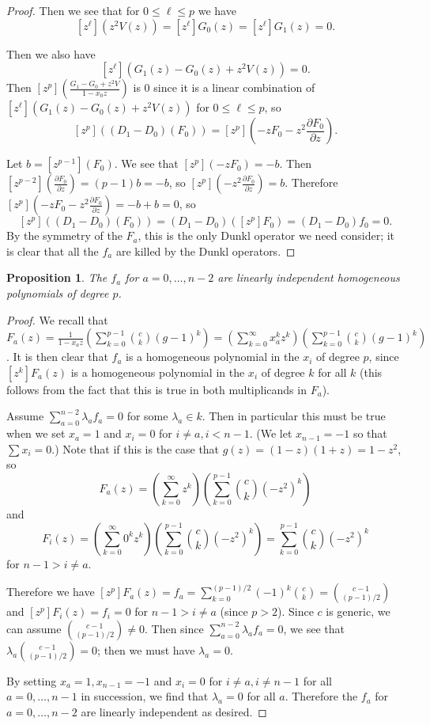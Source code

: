 \documentclass{article}
\numberwithin{equation}{section}
\newtheorem{proposition}[equation]{Proposition}
\begin{document}
\begin{proof}
Then we see that for $0 \le \ell \le p$ we have $$[z^\ell](z^2V(z))=[z^\ell]G_0(z)=[z^\ell]G_1(z)=0.$$

Then we also have
 $$[z^\ell](G_1(z)-G_0(z)+z^2V(z))=0.$$ Then $[z^p]\left(\frac{G_1-G_0+z^2V}{1-x_0z}\right)$ is $0$ since it is a linear combination of $[z^\ell](G_1(z)-G_0(z)+z^2V(z))$ for $0 \le \ell \le p$, so $$[z^p]\left((D_1-D_0)(F_0)\right)=[z^p]\left(-zF_0-z^2\frac{\partial F_0}{\partial z}\right).$$

Let $b=[z^{p-1}](F_0)$. We see that $[z^p](-zF_0)=-b$. Then $[z^{p-2}]\left(\frac{\partial F_0}{\partial z}\right)=(p-1)b=-b$, so $[z^p]\left(-z^2\frac{\partial F_0}{\partial z}\right)=b$. Therefore $[z^p]\left(-zF_0-z^2\frac{\partial F_0}{\partial z}\right)=-b+b=0$, so $$[z^p]((D_1-D_0)(F_0))=(D_1-D_0)([z^p]F_0)=(D_1-D_0)f_0=0.$$ By the symmetry of the $F_a$, this is the only Dunkl operator we need consider; it is clear that all the $f_a$ are killed by the Dunkl operators.
\end{proof}

\begin{proposition}\label{prop:linind} The $f_a$ for $a=0,\dots,n-2$ are linearly independent homogeneous polynomials of degree $p$.
\end{proposition} 

\begin{proof} 
We recall that $F_a(z)=\frac{1}{1-x_az}\left(\sum_{k=0}^{p-1} \binom{c}{k} (g-1)^k\right)=\left(\sum_{k=0}^\infty x_a^kz^k\right)\left(\sum_{k=0}^{p-1} \binom{c}{k} (g-1)^k\right)$. It is then clear that $f_a$ is a homogeneous polynomial in the $x_i$ of degree $p$, since $[z^k]F_a(z)$ is a homogeneous polynomial in the $x_i$ of degree $k$ for all $k$ (this follows from the fact that this is true in both multiplicands in $F_a$). 

Assume $\sum_{a=0}^{n-2} \lambda_af_a=0$ for some $\lambda_a \in k$. Then in particular this must be true when we set $x_a=1$ and $x_i=0$ for $i \ne a,i < n-1$. (We let $x_{n-1}=-1$ so that $\sum x_i=0$.) Note that if this is the case that $g(z)=(1-z)(1+z)=1-z^2$, so $$F_a(z)=\left(\sum_{k=0}^\infty z^k\right)\left(\sum_{k=0}^{p-1} \binom{c}{k} (-z^2)^k\right)$$ and $$F_i(z)=\left(\sum_{k=0}^\infty 0^kz^k\right)\left(\sum_{k=0}^{p-1} \binom{c}{k} (-z^2)^k\right)=\sum_{k=0}^{p-1} \binom{c}{k} (-z^2)^k$$ for $n-1>i \ne a$.

Therefore we have $[z^p]F_a(z)=f_a=\sum_{k=0}^{(p-1)/2} (-1)^k\binom{c}{k}=\binom{c-1}{(p-1)/2}$ and $[z^p]F_i(z)=f_i=0$ for $n-1>i \ne a$ (since $p > 2$). Since $c$ is generic, we can assume $\binom{c-1}{(p-1)/2} \ne 0$. Then since $\sum_{a=0}^{n-2} \lambda_af_a=0$, we see that $\lambda_a\binom{c-1}{(p-1)/2}=0$; then we must have $\lambda_a=0$.

By setting $x_a=1,x_{n-1}=-1$ and $x_i=0$ for $i \ne a, i \ne n-1$ for all $a=0,\dots,n-1$ in succession, we find that $\lambda_a=0$ for all $a$. Therefore the $f_a$ for $a=0,\dots,n-2$ are linearly independent as desired.

\end{proof}
\end{document}
